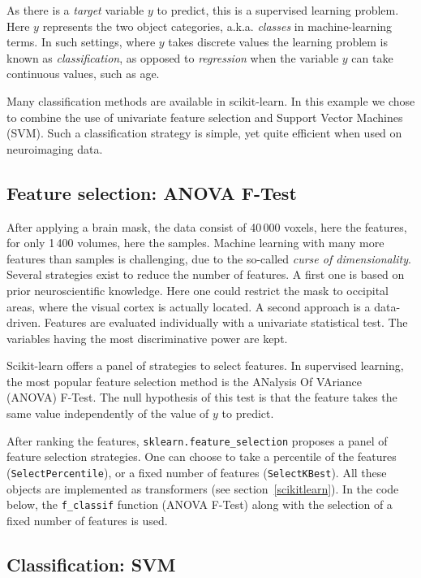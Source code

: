 \documentclass{frontiersSCNS} %
\newcommand{\michael}[1]{\todo[inline, color=yellow!40]{#1}}
\begin{document}
As there is a \emph{target} variable $y$ to predict, this is a supervised
learning problem. Here $y$ represents the two object categories, a.k.a.
\emph{classes} in machine-learning terms. In such settings, where $y$
takes discrete values the learning
problem is known as \emph{classification}, as opposed to
\emph{regression} when the variable $y$ can take continuous values,
such as age.

Many classification methods are available in scikit-learn. In this
example we chose to
combine the use of univariate feature selection and Support Vector
Machines (SVM). Such a classification strategy is simple,
yet quite efficient when used on neuroimaging data.

\subsection{Feature selection: ANOVA F-Test}

After applying a brain mask, the data consist of 40\,000 voxels, here
the features, for only 1\,400 volumes, here the samples.
Machine learning with many more features than samples
is challenging, due to the so-called \emph{curse of dimensionality}.
Several strategies exist to reduce the number of features.
A first one is based on prior neuroscientific
knowledge. Here one could restrict the mask to occipital areas, where the visual
cortex is actually located.\michael{In what sense "actually"? Remove the word?} A second approach is a data-driven. Features
are evaluated individually with a univariate statistical test. The variables
having the most discriminative power are kept.

Scikit-learn offers a panel of strategies to select features. In supervised
learning, the most popular feature selection method is the
ANalysis Of VAriance (ANOVA) F-Test. 
The null hypothesis of this test is that the feature takes the same value
independently of the value of $y$ to predict.

After ranking the features, \verb!sklearn.feature_selection! proposes a panel
of feature selection strategies. One can choose to take a percentile of the features
(\verb!SelectPercentile!), or a fixed number of features (\verb!SelectKBest!).
All these objects are implemented as transformers (see
 section~\ref{scikitlearn}).
In the code below, the \verb!f_classif! function (ANOVA F-Test) along with
the selection of a fixed number of features is used.

\subsection{Classification: SVM}
\end{document}
